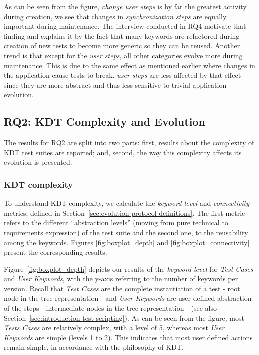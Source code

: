 As can be seen from the figure, \emph{change user steps} is by far the greatest activity during creation, we see that changes in \emph{synchronization steps} are equally important during maintenance. The interview conducted in RQ4 motivate that finding and explains it by the fact that many keywords are refactored during creation of new tests to become more generic so they can be reused. Another trend is that except for the \emph{user steps}, all other categories evolve more during maintenance. This is due to the same effect as mentioned earlier where changes in the application cause tests to break. \emph{user steps} are less affected by that effect since they are more abstract and thus less sensitive to trivial application evolution.

\subsection{RQ2: KDT Complexity and Evolution}
\label{sec:evolution-results-rq2}

The results for RQ2 are split into two parts: first, results about the complexity of KDT test suites are reported; and, second, the way this complexity affects its evolution is presented.

\subsubsection{KDT complexity}
\label{sec:kdt-test-suite}

To understand KDT complexity, we calculate the \emph{keyword level} and \emph{connectivity} metrics, defined in Section~\ref{sec:evolution-protocol-definitions}. The first metric refers to the different ``abstraction levels'' (moving from pure technical to requirements expression) of the test suite and the second one, to the reusability among the keywords. Figures \ref{fig:boxplot_depth} and \ref{fig:boxplot_connectivity} present the corresponding results.

Figure~\ref{fig:boxplot_depth} depicts our results of the \emph{keyword level} for \emph{Test Cases} and \emph{User Keywords}, with the y-axis referring to the number of keywords per version. Recall that \emph{Test Cases} are the complete instantiation of a test - root node in the tree representation - and \emph{User Keywords} are user defined abstraction of the steps - intermediate nodes in the tree representation - (see also Section~\ref{sec:introduction-test-scripting}). As can be seen from the figure, most \emph{Tests Cases} are relatively complex, with a level of 5, whereas most \emph{User Keywords} are simple (levels 1 to 2). This indicates that most user defined actions remain simple, in accordance with the philosophy of KDT.

